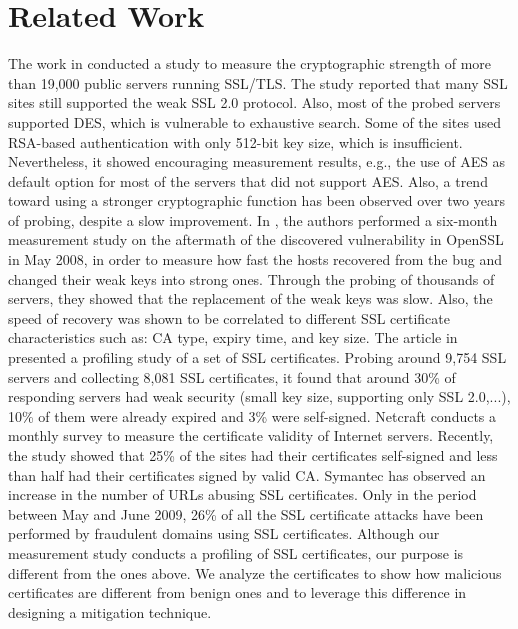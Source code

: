 \documentclass[twocolumn]{article}
\begin{document}
\section{Related Work}\label{sec:related}
The work in \cite{ssl-crypt-strength} conducted a study to measure the 
cryptographic strength of more than 19,000 public servers running SSL/TLS. The study reported that
 many SSL sites still supported the weak SSL 2.0 protocol. Also, most of the probed servers
 supported DES, which is vulnerable to exhaustive search. Some of the sites used RSA-based 
authentication with only 512-bit key size, which is insufficient. Nevertheless, it
showed encouraging measurement results, e.g., the use of AES as default option for most of 
the servers that did not support AES. Also, a trend toward using a stronger cryptographic function 
has been observed over two years of probing, despite a slow improvement. In \cite{ssl-priv-public}, 
the authors performed a six-month measurement study on the aftermath of the discovered vulnerability 
in OpenSSL in May 2008, in order to measure how fast the hosts recovered from the bug and changed 
their weak keys into strong ones. 
Through the probing of thousands of servers, they showed that the replacement of the weak keys was 
slow. Also, the speed of recovery was shown to be correlated to different SSL certificate characteristics 
such as: CA type, expiry time, and key size. The article in \cite{ssl-survey-2000} presented a profiling 
study of a set of SSL certificates.  Probing around  9,754  SSL servers and collecting 8,081 SSL certificates, 
it found that  around 30\% of responding servers had weak security (small key size, supporting only SSL 2.0,...), 
10\% of them were already expired and 3\% were  self-signed. Netcraft \cite{netcraft-survey} conducts a monthly 
survey to measure the certificate validity of Internet servers. Recently, the study showed that 25\% of the 
sites had their certificates self-signed and less than half had their certificates signed by valid CA. Symantec 
\cite{symmantec-blog} has observed an increase in the number of URLs abusing SSL certificates. Only in the 
period between May and June 2009, 26\% of all the SSL certificate attacks have been performed 
by fraudulent domains using SSL certificates. Although our measurement study conducts a profiling of 
SSL certificates, our purpose is different from the ones above. We analyze the certificates to show how 
malicious certificates are different from benign ones and to leverage this difference in designing a mitigation technique.  
\end{document}
